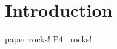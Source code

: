 \section{Introduction} 
\label{sec:introduction}

 paper rocks! P4~\cite{Bosshart2014} rocks!

\blindtext[2]

